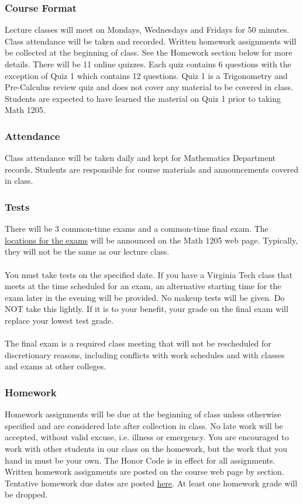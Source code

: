 \documentclass{article}
\begin{document}
			\subsubsection*{Course Format} 
			Lecture classes will meet on Mondays, Wednesdays and Fridays for 50
			minutes.  Class attendance will be taken and recorded. Written homework
			assignments will be collected at the beginning of class. See the
			Homework section below for more details. There will be 11 online
			quizzes. Each quiz contains 6 questions with the exception of Quiz 1
			which contains 12 questions.  Quiz 1 is a Trigonometry and Pre-Calculus
			review quiz and does not cover any material to be covered in class.
			Students are expected to have learned the material on Quiz 1 prior to
			taking Math 1205.
		
			\subsubsection*{Attendance} 
			Class attendance will be taken daily and kept for Mathematics Department
			records. Students are responsible for course materials and announcements
			covered in class.

			\subsubsection*{Tests} 
			There will be 3 common-time exams and a common-time final exam. The \href{http://www.emporium.vt.edu/math1205/resources/testinfo}{locations
			for the exams} will be announced on the Math 1205 web page.
			Typically, they will not be the same as our lecture class. \\ \\
			You must take tests on the specified date. If you have a Virginia Tech
			class that meets at the time scheduled for an exam, an alternative
			starting time for the exam later in the evening will be provided.  No
			makeup tests will be given.  Do NOT take this lightly. If it is to your
			benefit, your grade on the final exam will replace your lowest test
			grade. \\ \\
			The final exam is a required class meeting that will not be rescheduled
			for discretionary reasons, including conflicts with work schedules and
			with classes and exams at other colleges. 
			
			\subsubsection*{Homework}
			Homework assignments will be due at the beginning of class unless
			otherwise specified and are considered late after collection in class. No
			late work will be accepted, without valid excuse, i.e. illness or
			emergency. You are encouraged to work with other students in our class on
			the homework, but the work that you hand in must be your own. The Honor
			Code is in effect for all assignments. Written homework assignments are
			posted on the course web page by section. Tentative homework due dates are
			posted \href{http://www.math.vt.edu/people/erichlf/HWS11.html}{here}.
			At least one homework grade will be dropped. 
			
\end{document}
